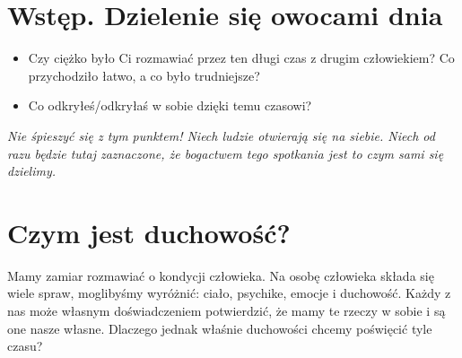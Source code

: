 \documentclass[a5paper,10pt,polish]{book}
\begin{document}
\section{Wstęp. Dzielenie  się owocami dnia}
\label{babice2006-wiosna-knurow/spotkanie1:wstep-dzielenie-sie-owocami-dnia}\begin{itemize}
\item {} 
Czy ciężko  było Ci rozmawiać przez ten długi  czas  z drugim człowiekiem? Co przychodziło łatwo, a co było trudniejsze?

\item {} 
Co odkryłeś/odkryłaś w sobie dzięki temu czasowi?

\end{itemize}

\emph{Nie śpieszyć się z tym  punktem! Niech ludzie otwierają  się na siebie. Niech od razu będzie tutaj zaznaczone, że bogactwem  tego spotkania jest to czym sami się dzielimy.}


\section{Czym  jest duchowość?}
\label{babice2006-wiosna-knurow/spotkanie1:czym-jest-duchowosc}
Mamy zamiar rozmawiać o kondycji człowieka. Na osobę człowieka składa się wiele spraw, moglibyśmy wyróżnić: ciało, psychike, emocje i duchowość. Każdy z nas może własnym doświadczeniem potwierdzić, że mamy te rzeczy w sobie i są one nasze własne.  Dlaczego jednak właśnie duchowości chcemy poświęcić tyle czasu?
\end{document}
